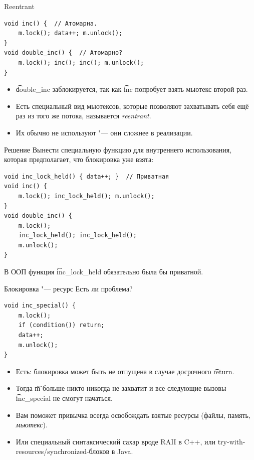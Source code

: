 \begin{frame}[fragile]{Reentrant}
\begin{verbatim}
void inc() {  // Атомарна.
    m.lock(); data++; m.unlock();
}
void double_inc() {  // Атомарно?
    m.lock(); inc(); inc(); m.unlock();
}
\end{verbatim}
	\begin{itemize}
		\item \t{double\_inc} заблокируется, так как \t{inc} попробует взять мьютекс второй раз.
		\item Есть специальный вид мьютексов, которые позволяют захватывать себя ещё раз из того же потока, называется \textit{reentrant}.
		\item Их обычно не используют "--- они сложнее в реализации.
	\end{itemize}
\end{frame}

\begin{frame}[fragile]{Решение}
	Вынести специальную функцию для внутреннего использования, которая предполагает, что блокировка уже взята:
\begin{verbatim}
void inc_lock_held() { data++; }  // Приватная
void inc() {
    m.lock(); inc_lock_held(); m.unlock();
}
void double_inc() {
    m.lock();
    inc_lock_held(); inc_lock_held();
    m.unlock();
}
\end{verbatim}
	В ООП функция \t{inc\_lock\_held} обязательно была бы приватной.
\end{frame}

\begin{frame}[fragile]{Блокировка "--- ресурс}
	Есть ли проблема?
\begin{verbatim}
void inc_special() {
    m.lock();
    if (condition()) return;
    data++;
    m.unlock();
}
\end{verbatim}
	\pause
	\begin{itemize}
		\item Есть: блокировка может быть не отпущена в случае досрочного \t{return}.
		\item Тогда \t{m} больше никто никогда не захватит и все следующие вызовы \t{inc\_special} не смогут начаться.
		\item Вам поможет привычка всегда освобождать взятые ресурсы (файлы, память, \textit{мьютекс}).
		\item Или специальный синтаксический сахар вроде RAII в C++, или try-with-resources/synchronized-блоков в Java.
	\end{itemize}
\end{frame}

